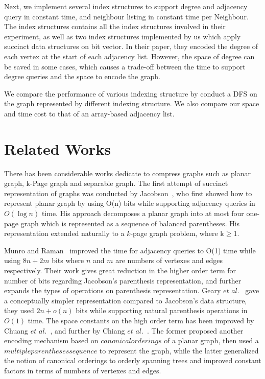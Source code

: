 \documentclass[12pt,glossary]{dalthesis}
\begin{document}
\bigskip
\bigskip

Next, we implement several index structures to support degree and adjacency query in constant time, and neighbour listing in constant time per Neighbour. The index structures contains all the index structures involved in their experiment, as well as two index structures implemented by us which apply succinct data structures on bit vector. In their paper, they encoded the degree of each vertex at the start of each adjacency list. However, the space of degree can be saved in some cases, which causes a trade-off between the time to support degree queries and the space to encode the graph.

\bigskip
\bigskip

We compare the performance of various indexing structure by conduct a DFS on the graph represented by different indexing structure. We also compare our space and time cost to that of an array-based adjacency list.  

\section{Related Works}

There has been considerable works dedicate to compress graphs such as planar graph, k-Page graph and separable graph. The first attempt of succinct representation of graphs was conducted by Jacobson~\cite{Jacobson}, who first showed how to represent planar graph by using O(n) bits while supporting adjacency queries in $O(\log n)$ time. His approach decomposes a planar graph into at most four one-page graph which is represented as a sequence of balanced parentheses. His representation extended naturally to a $k$-page graph problem, where k$\geq$1.

\bigskip
\bigskip

Munro and Raman~\cite{Munro} improved the time for adjacency queries to O(1) time while using $8n+2m$ bits where $n$ and $m$ are numbers of vertexes and edges respectively. Their work gives great reduction in the higher order term for number of bits regarding Jacobson's parenthesis representation, and further expands the types of operations on parenthesis representation. Geary $et$ $al.$~\cite{Geary} gave a conceptually simpler representation compared to Jacobson's data structure, they used $2n+o(n)$ bits while supporting natural parenthesis operations in $O(1)$ time. The space constants on the high order term has been improved by Chuang $et$ $al.$~\cite{Chuang}, and further by Chiang $et$ $al.$~\cite{Chiang}. The former proposed another encoding mechanism based on $canonical orderings$ of a planar graph, then used a $multiple parentheses sequence$ to represent the graph, while the latter generalized the notion of canonical orderings to orderly spanning trees and improved constant factors in terms of numbers of vertexes and edges. 
\end{document}
